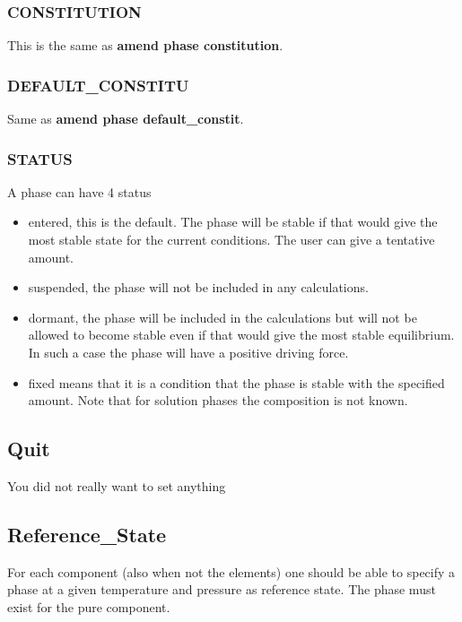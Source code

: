 \documentclass[12pt]{article}
\begin{document}
\subsubsection{CONSTITUTION}

This is the same as {\bf amend phase constitution}.

\subsubsection{DEFAULT\_CONSTITU}

Same as {\bf amend phase default\_constit}.

\subsubsection{STATUS}

A phase can have 4 status

\begin{itemize}
\item entered, this is the default.  The phase will be stable if that
would give the most stable state for the current conditions.  The user
can give a tentative amount.
\item suspended, the phase will not be included in any calculations.
\item dormant, the phase will be included in the calculations but will
not be allowed to become stable even if that would give the most
stable equilibrium.  In such a case the phase will have a positive
driving force.
\item fixed means that it is a condition that the phase is stable with
the specified amount.  Note that for solution phases the composition
is not known.
\end{itemize}

\subsection{Quit}

You did not really want to set anything

\subsection{Reference\_State}

For each component (also when not the elements) one should be able to
specify a phase at a given temperature and pressure as reference
state.  The phase must exist for the pure component.
\end{document}
